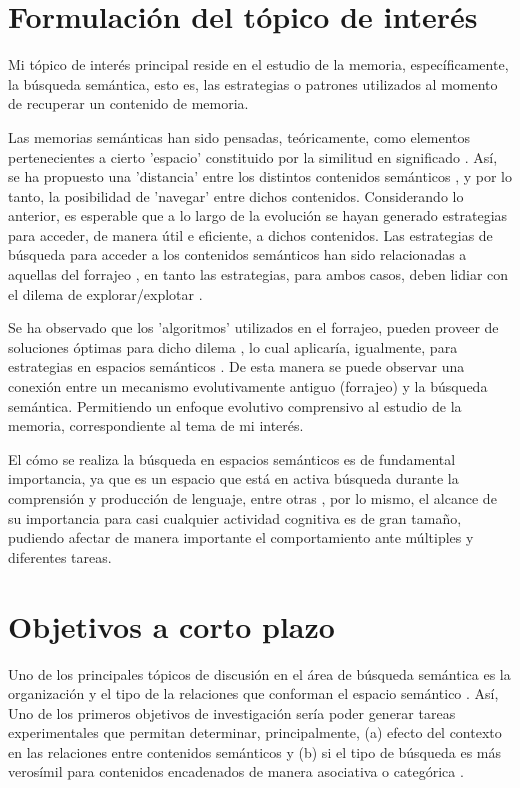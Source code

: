 \documentclass[11pt]{article}
\begin{document}
\section*{Formulación del tópico de interés}
\label{sec:org97513b9}
Mi tópico de interés principal reside en el estudio de la memoria,
específicamente, la búsqueda semántica, esto es, las estrategias o patrones
utilizados al momento de recuperar un contenido de memoria.

 Las memorias semánticas han sido pensadas, teóricamente, como elementos
pertenecientes a cierto 'espacio' constituido por la similitud en significado
\citep{lundProducingHighdimensionalSemantic1996}. Así, se ha propuesto una
'distancia' entre los distintos contenidos semánticos
\citep{montezRoleSemanticClustering2015}, y por lo tanto, la posibilidad de
'navegar' entre dichos contenidos. Considerando lo anterior, es esperable que a
lo largo de la evolución se hayan generado estrategias para acceder, de manera
útil e eficiente, a dichos contenidos. Las estrategias de búsqueda para acceder
a los contenidos semánticos han sido relacionadas a aquellas del forrajeo
\citep{hillsAnimalForagingEvolution2006,hillsOptimalForagingSemantic2012},
en tanto las estrategias, para ambos casos, deben lidiar con el dilema de
explorar/explotar \citep{berger-talExplorationExploitationDilemmaMultidisciplinary2014}.

Se ha observado que los 'algoritmos' utilizados en el forrajeo, pueden proveer
de soluciones óptimas para dicho dilema
\citep{bartumeusAnimalSearchStrategies2005a}, lo cual aplicaría, igualmente, para
estrategias en espacios semánticos \citep{montezRoleSemanticClustering2015}. De
esta manera se puede observar una conexión entre un mecanismo evolutivamente
antiguo (forrajeo) y la búsqueda semántica. Permitiendo un enfoque evolutivo
comprensivo al estudio de la memoria, correspondiente al tema de mi interés.

El cómo se realiza la búsqueda en espacios semánticos es de
fundamental importancia, ya que es un espacio que está en activa
búsqueda durante la comprensión y producción de lenguaje, entre otras
\citep{montezRoleSemanticClustering2015}, por lo mismo, el alcance de su
importancia para casi cualquier actividad cognitiva es de gran tamaño,
pudiendo afectar de manera importante el comportamiento ante múltiples y
diferentes tareas.
\section*{Objetivos a corto plazo}
\label{sec:orgb0a0ba6}
Uno de los principales tópicos de discusión en el área de búsqueda
semántica es la organización y el tipo de la relaciones que conforman
el espacio semántico \citep{lundProducingHighdimensionalSemantic1996}. Así, Uno de los primeros
objetivos de investigación sería poder generar tareas
experimentales que permitan determinar, principalmente, (a) efecto
del contexto en las relaciones entre contenidos semánticos
\citep{schillerMemorySpaceUnderstanding2015} y (b) si el tipo de búsqueda es más
verosímil para contenidos encadenados de manera asociativa o categórica
\citep{hillsOptimalForagingSemantic2012}. 
\end{document}
